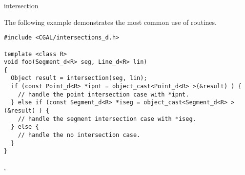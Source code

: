 \begin{ccRefFunction}{intersection}
\ccExample

The following example demonstrates the most common use of 
 routines.
\ccHtmlLinksOff%
\begin{verbatim}
#include <CGAL/intersections_d.h>

template <class R>
void foo(Segment_d<R> seg, Line_d<R> lin)
{
  Object result = intersection(seg, lin);
  if (const Point_d<R> *ipnt = object_cast<Point_d<R> >(&result) ) {
    // handle the point intersection case with *ipnt.
  } else if (const Segment_d<R> *iseg = object_cast<Segment_d<R> >(&result) ) {
    // handle the segment intersection case with *iseg.
  } else {
    // handle the no intersection case.
  }
}
\end{verbatim}%
\ccHtmlLinksOn%

\ccSeeAlso
{},  
\end{ccRefFunction}
